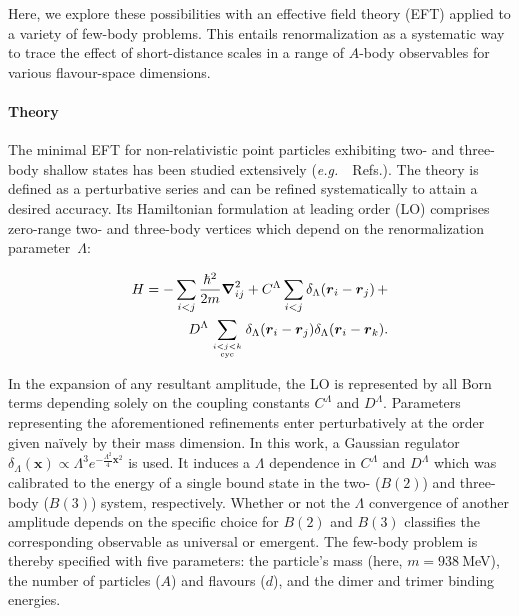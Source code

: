 \documentclass[aps,prl,onecolumn,groupedaddress,superscriptaddress]
{revtex4}
\newcommand{\lec}{C^\Lambda}
\newcommand{\led}{D^\Lambda}
\newcommand{\eg}{\textit{e.g.}~}
\newcommand{\ve}[1]{\ensuremath{\boldsymbol{#1}}}
\begin{document}
Here, we explore these possibilities with an effective field theory (EFT)
applied to a variety of few-body problems. 
This entails renormalization as a systematic way to trace the effect of
short-distance scales in a range of $A$-body observables for various flavour-space dimensions.

\vspace{4mm}
\paragraph*{Theory}
The 
minimal EFT for non-relativistic point particles exhibiting two- and three-body shallow states has been studied extensively
(\eg~Refs.\cite{Lepage:1997cs,vanKolck:1999mw, Bedaque:1998kg, Braaten:2004rn, Hammer:2017tjm, Hammer:2019poc}).
The theory is defined as a perturbative series and can be refined
systematically to attain a desired accuracy. Its Hamiltonian formulation at
leading order (LO) comprises zero-range two- and three-body vertices which
depend on the renormalization parameter~$\Lambda$:

\begin{align}
H = - \sum_{i<j} \frac{\hbar^2}{2m}\ve{\nabla}_{ij}^2+ \lec \sum_{i<j}{\delta_\Lambda(\ve{r}_i-\ve{r}_j)} 
\,+\nonumber\\
\led \sum_{ i<j<k \atop \text{cyc} }\delta_\Lambda(\ve{r}_i-\ve{r}_j)\delta_\Lambda(\ve{r}_i-\ve{r}_k).
\label{eq:hamiltonian}
\end{align}

In the expansion of any resultant amplitude, the LO is represented by all Born
terms depending solely on the coupling constants $\lec$ and $\led$. 
Parameters representing the aforementioned refinements
enter perturbatively at the order given na\"ively by their mass
dimension. 
In this work, a Gaussian regulator 
\mbox{$\delta_\Lambda(\ve{x}) \propto\Lambda^3 e^{-\frac{\Lambda^2}{4}\ve{x}^2}$} is used.
It induces a $\Lambda$ dependence in $\lec$ and $\led$ which was calibrated to
the energy of a single bound state in the two- ($B(2)$) and three-body
($B(3)$) system, respectively.
Whether or not the $\Lambda$ convergence of another amplitude depends on the
specific choice for $B(2)$ and $B(3)$ classifies the corresponding observable as
universal or emergent.
The few-body problem is thereby specified with five parameters: the particle's mass
(here, $m=938~$MeV), the number of particles ($A$) and flavours ($d$),
and the dimer and trimer binding energies.
\end{document}
